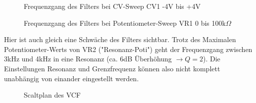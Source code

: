 \begin{figure}[h]
	\centering
	\setlength{\fboxsep}{1pt} %
	\setlength{\fboxrule}{1pt} %
	\caption{Frequenzgang des Filters bei CV-Sweep CV1 -4V bis +4V}
	\label{fig:toleranzschema}
\end{figure}

\begin{figure}[h]
	\centering
	\setlength{\fboxsep}{1pt} %
	\setlength{\fboxrule}{1pt} %
	\caption{Frequenzgang des Filters bei Potentiometer-Sweep VR1 0 bis 100k$\Omega$}
	\label{fig:toleranzschema}
\end{figure}

Hier ist auch gleich eine Schwäche des Filters sichtbar. Trotz des Maximalen Potentiometer-Werts von VR2 ("Resonanz-Poti") geht der Frequenzgang
zwischen 3kHz und 4kHz in eine Resonanz (ca. 6dB Überhöhung $\rightarrow Q = 2$). Die Einstellungen Resonanz und Grenzfrequenz können also nicht komplett unabhängig von einander eingestellt werden.

\begin{figure}[h]
	\centering
	\setlength{\fboxsep}{1pt} %
	\setlength{\fboxrule}{1pt} %
	\caption{Scaltplan des VCF}
\end{figure}
\newpage
